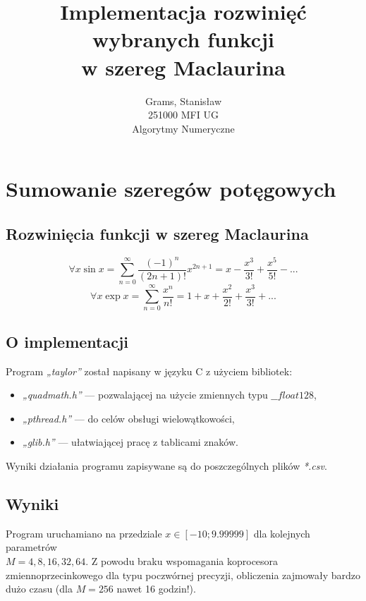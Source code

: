 \documentclass[12pt]{article}
\begin{document}
\title{Implementacja rozwinięć wybranych funkcji\\w szereg Maclaurina}
\author{Grams, Stanisław\\251000 MFI UG\\Algorytmy Numeryczne}

\maketitle

\section{Sumowanie szeregów potęgowych}

\subsection{Rozwinięcia funkcji w szereg Maclaurina}
$$ \forall{x} \sin x = \sum_{n=0}^{\infty} \frac{(-1)^n}{(2n+1)!} x^{2n+1} = x - \frac{x^3}{3!} + \frac{x^5}{5!} - ...$$
$$ \forall {x} \exp{x} = \sum_{n=0}^{\infty} \frac{x^n}{n!} = 1 + x + \frac{x^2}{2!} + \frac{x^3}{3!} + ...$$

\subsection{O implementacji}
Program \textit{„taylor”} został napisany w języku C z użyciem bibliotek:
\begin{itemize}
    \item \textit{„quadmath.h”} — pozwalającej na użycie zmiennych typu $\_\_float128$,
    \item \textit{„pthread.h”} — do celów obsługi wielowątkowości,
    \item \textit{„glib.h”} — ułatwiającej pracę z tablicami znaków.
\end{itemize}
Wyniki działania programu zapisywane są do poszczególnych plików \textit{*.csv}.

\subsection{Wyniki}
Program uruchamiano na przedziale $x \in [-10; 9.99999]$ dla kolejnych parametrów\\$M = 4, 8, 16, 32, 64$. Z powodu braku wspomagania koprocesora zmiennoprzecinkowego dla typu poczwórnej precyzji, obliczenia zajmowały bardzo dużo czasu (dla $M = 256$ nawet 16 godzin!).
\end{document}
